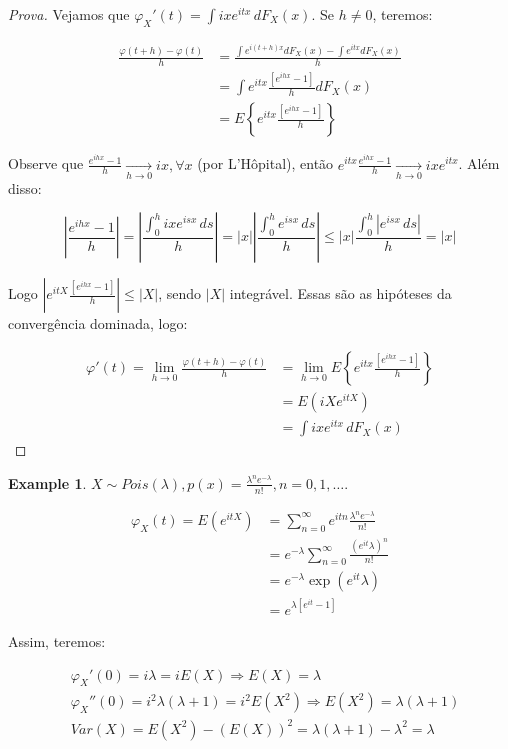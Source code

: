 \documentclass[
]{article}
\theoremstyle{definition}
\theoremstyle{definition}
\newtheorem{example}{Example}[section]
\theoremstyle{definition}
\theoremstyle{definition}
\theoremstyle{remark}
\begin{document}
\begin{proof}[Prova]
Vejamos que \(\varphi_{X}'(t) = \int ixe^{itx}\, dF_{X}(x)\). Se \(h \neq 0\), teremos:

\begin{align*}
\frac{\varphi(t + h) - \varphi(t)}{h} &= \frac{\int e^{i(t + h)x}dF_{X}(x) - \int e^{itx}dF_{X}(x)}{h} \\
&= \int e^{itx}\frac{[e^{ihx} - 1]}{h}dF_{X}(x) \\
&= E\left\{e^{itx}\frac{[e^{ihx} - 1]}{h}\right\}
\end{align*}

Observe que \(\frac{e^{ihx} - 1}{h} \xrightarrow[h \to 0]{}ix, \forall x\) (por L'Hôpital), então \(e^{itx}\frac{e^{ihx} - 1}{h} \xrightarrow[h \to 0]{}ixe^{itx}\). Além disso:

\begin{equation*}
\left|\frac{e^{ihx} - 1}{h}\right| = \left|\frac{\int_{0}^{h} ixe^{isx}\, ds}{h}\right| = |x|\left|\frac{\int_{0}^{h} e^{isx}\, ds}{h}\right| \le |x|\frac{\int_{0}^{h}|e^{isx}\, ds|}{h} = |x|
\end{equation*}

Logo \(\left|e^{itX} \frac{[e^{ihx} - 1]}{h}\right| \le |X|\), sendo \(|X|\) integrável. Essas são as hipóteses da convergência dominada, logo:

\begin{align*}
\varphi'(t) = \lim_{h \to 0}\frac{\varphi(t+h) - \varphi(t)}{h} &= \lim_{h \to 0}E\left\{e^{itx}\frac{[e^{ihx} - 1]}{h}\right\} \\
&= E(iXe^{itX}) \\
&= \int ixe^{itx}\, dF_{X}(x)
\end{align*}
\end{proof}

\begin{example}
\(X \sim Pois(\lambda), p(x) = \frac{\lambda^{n}e^{-\lambda}}{n!}, n = 0,1,\ldots\).

\begin{align*}
\varphi_{X}(t) = E(e^{itX}) &= \sum_{n=0}^{\infty}e^{itn}\frac{\lambda^{n}e^{-\lambda}}{n!} \\
&= e^{-\lambda}\sum_{n=0}^{\infty}\frac{(e^{it}\lambda)^{n}}{n!} \\
&= e^{-\lambda}\exp(e^{it}\lambda) \\
&= e^{\lambda[e^{it} - 1]}
\end{align*}

Assim, teremos:

\begin{align*}
&\varphi_{X}'(0) = i \lambda = iE(X) \Rightarrow E(X) = \lambda \\
&\varphi_{X}''(0) = i^{2}\lambda(\lambda + 1) = i^{2}E(X^{2}) \Rightarrow E(X^{2}) = \lambda(\lambda + 1) \\
&Var(X) = E(X^{2}) - (E(X))^{2} = \lambda(\lambda + 1) - \lambda^{2} = \lambda
\end{align*}
\end{example}
\end{document}
